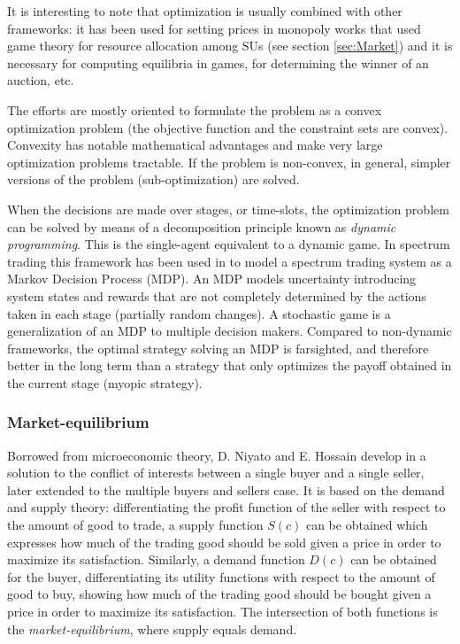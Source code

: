 It is interesting to note that optimization is usually combined with other frameworks: it has been used for setting prices in monopoly works that used game theory for resource allocation among SUs (see section \ref{sec:Market}) and it is necessary for computing equilibria in games, for determining the winner of an auction, etc. 

The efforts are mostly oriented to formulate the problem as a convex optimization problem (the objective function and the constraint sets are convex).
Convexity has notable mathematical advantages and make very large optimization problems tractable.
If the problem is non-convex, in general, simpler versions of the problem (sub-optimization) are solved.

When the decisions are made over stages, or time-slots, the optimization problem can be solved by means of a decomposition principle known as \textit{dynamic programming}. 
This is the single-agent equivalent to a dynamic game. 
In spectrum trading this framework has been used in \cite{ref:Mutlu2008} to model a spectrum trading system as a Markov Decision Process (MDP). 
An MDP models uncertainty introducing system states and rewards that are not completely determined by the actions taken in each stage (partially random changes).  
A stochastic game is a generalization of an MDP to multiple decision makers. 
Compared to non-dynamic frameworks, the optimal strategy solving an MDP is farsighted, and therefore better in the long term than a strategy that only optimizes the payoff obtained in the current stage (myopic strategy).

\subsubsection{Market-equilibrium}
\label{subsec:marketeq}
Borrowed from microeconomic theory, D. Niyato and E. Hossain develop in \cite{ref:Niyato2007_Hier,ref:Niyato2007_Eq,ref:Niyato2008_Mark,ref:Niyato2008_Spec,ref:Niyato2010,ref:Xu2011} a solution to the conflict of interests between a single buyer and a single seller, later extended to the multiple buyers and sellers case.
It is based on the demand and supply theory: differentiating the profit function of the seller with respect to the amount of good to trade, a supply function $S(c)$ can be obtained which expresses how much of the trading good should be sold given a price in order to maximize its satisfaction. 
Similarly, a demand function $D(c)$ can be obtained for the buyer, differentiating its utility functions with respect to the amount of good to buy, showing how much of the trading good should be bought given a price in order to maximize its satisfaction. 
The intersection of both functions is the \textit{market-equilibrium}, where supply equals demand.

